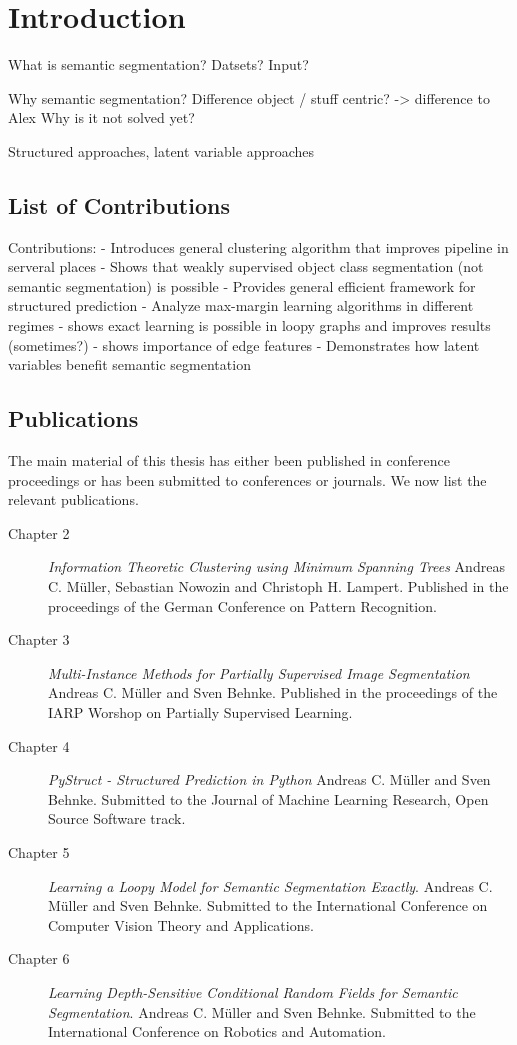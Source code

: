 \chapter{Introduction}

What is semantic segmentation?
Datsets? Input?

Why semantic segmentation? Difference object / stuff centric? -> difference to Alex
Why is it not solved yet?


Structured approaches, latent variable approaches

\section{List of Contributions}
Contributions:
- Introduces general clustering algorithm that improves pipeline in serveral places
- Shows that weakly supervised object class segmentation (not semantic segmentation) is possible
- Provides general efficient framework for structured prediction
- Analyze max-margin learning algorithms in different regimes
- shows exact learning is possible in loopy graphs and improves results (sometimes?)
- shows importance of edge features
- Demonstrates how latent variables benefit semantic segmentation

\section{Publications}
The main material of this thesis has either been published in conference proceedings or has been
submitted to conferences or journals. We now list the relevant publications.
\begin{description}
    \item[Chapter 2] \emph{Information Theoretic Clustering using Minimum Spanning Trees} Andreas C. M\"uller, Sebastian Nowozin and Christoph H. Lampert. Published in the proceedings of the German Conference on Pattern Recognition.
    \item[Chapter 3] \emph{Multi-Instance Methods for Partially Supervised Image Segmentation} Andreas C. M\"uller and Sven Behnke. Published in the proceedings of the IARP Worshop on Partially Supervised Learning.
    \item[Chapter 4] \emph{PyStruct - Structured Prediction in Python} Andreas C. M\"uller and Sven Behnke. Submitted to the Journal of Machine Learning Research, Open Source Software track.
    \item[Chapter 5] \emph{Learning a Loopy Model for Semantic Segmentation Exactly}. Andreas C. M\"uller and Sven Behnke. Submitted to the International Conference on Computer Vision Theory and Applications.
    \item[Chapter 6] \emph{Learning Depth-Sensitive Conditional Random Fields for Semantic Segmentation}. Andreas C. M\"uller and Sven Behnke. Submitted to the International Conference on Robotics and Automation.
\end{description}

